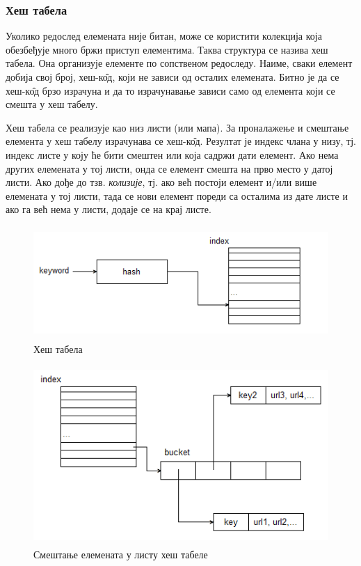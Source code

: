 \subsubsection{Хеш табела}

Уколико редослед елемената није битан, може се користити колекција која обезбеђује много бржи приступ елементима. Таква структура се назива хеш табела. Она организује елементе по сопственом редоследу. Наиме, сваки елемент добија свој број, хеш-к\^{о}д, који не зависи од осталих елемената. Битно је да се хеш-к\^{о}д брзо израчуна и да то израчунавање зависи само од елемента који се смешта у хеш табелу.

Хеш табела се реализује као низ листи (или мапа). За проналажење и смештање елемента у хеш табелу израчунава се хеш-к\^{о}д. Резултат је индекс члана у низу, тј. индекс листе у коју ће бити смештен или која садржи дати елемент. Ако нема других елемената у тој листи, онда се елемент смешта на прво место у датој листи. Ако дође до тзв. \emph{колизије}, тј. ако већ постоји елемент и/или више елемената у тој листи, тада се нови елемент пореди са осталима из дате листе и ако га већ нема у листи, додаје се на крај листе.

\begin{figure}[here]
\centering
\includegraphics[height=162px, width=472px]{hashtab1.png}
\caption{Хеш табела}
\label{slike:hash1}
\end{figure}

\begin{figure}[here]
\centering
\includegraphics[height=257px, width=446px]{hashtab2.png}
\caption{Смештање елемената у листу хеш табеле}
\label{slike:hash2}
\end{figure}

